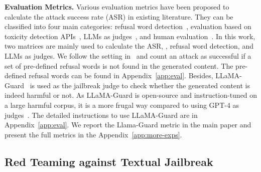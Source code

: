\noindent\textbf{Evaluation Metrics.} Various evaluation metrics have been proposed to calculate the attack success rate (ASR) in existing literature. They can be classified into four main categories: refusal word detection~\citep{zou2023universal, liu2023autodan}, evaluation based on toxicity detection APIs~\citep{qi2023visual, shen2023anything}, LLMs as judges~\citep{liu2023autodan, gong2023figstep, qi2023visual}, and human evaluation~\citep{shayegani2023jailbreak}. In this work, two matrices are mainly used to calculate the ASR, \ie, refusal word detection, and LLMs as judges.  We follow the setting in~\cite{zou2023universal, liu2023autodan} and count an attack as successful if a set of pre-defined refusal words is not found in the generated content. The pre-defined refusal words can be found in Appendix~\ref{app:eval}. Besides, LLaMA-Guard~\cite{inan2023llama} is used as the jailbreak judge to check whether the generated content is indeed harmful or not. As LLaMA-Guard is open-source and instruction-tuned on a large harmful corpus, it is a more frugal way compared to using GPT-4 as judges~\citep{liu2023autodan, gong2023figstep, qi2023visual}. The detailed instructions to use LLaMA-Guard are in Appendix~\ref{app:eval}. We report the Llama-Guard metric in the main paper and present the full metrics in the Appendix~\ref{app:more-exps}.

\subsection{Red Teaming against Textual Jailbreak}

\begin{table}[]
\caption{The jailbreak success rate of GCG and AutoDAN evaluated by Llama-Guard. The lowest success rate is in bold. }
\label{tab:gcg-autodan-results}
\end{table}

